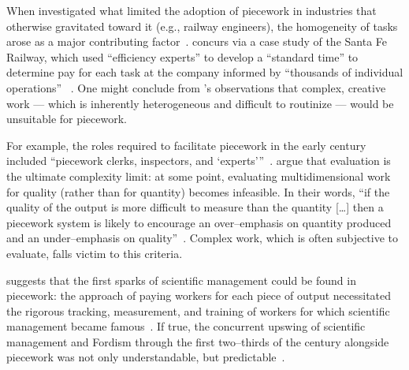 \documentclass[trackingWork]{subfiles}
\begin{document}
{
When \citeauthor{Brown01041990} investigated
what limited the adoption of piecework in industries that otherwise gravitated toward it
(e.g., railway engineers),
the homogeneity of tasks arose as a major contributing factor~\cite{Brown01041990}.
\citeauthor{10.2307/23702539} concurs via a case study of the Santa Fe Railway,
which used ``efficiency experts'' to develop a ``standard time''
to determine pay for each task at the company informed by
``thousands of individual operations''%
~\cite{10.2307/23702539}.
One might conclude from \citeauthor{10.2307/23702539}'s observations that
complex, creative work
--- which is inherently heterogeneous and difficult to routinize ---
would be unsuitable for piecework.

For example, the roles required to facilitate piecework in the early  century included ``piecework clerks, inspectors, and `experts'''~\cite{10.2307/23702539}.
\citeauthor{hart2016rise} argue that evaluation is the ultimate complexity limit:
at some point, evaluating multidimensional work for quality
(rather than for quantity) becomes infeasible.
In their words,
``if the quality of the output is more difficult to measure than the quantity [\ldots]
then a piecework system is likely to encourage
an over--emphasis on quantity produced and an under--emphasis on quality''~\cite{hart2016rise}.
Complex work, which is often subjective to evaluate, falls victim to this criteria.

\citeauthor{10.2307/23702539} suggests that the first sparks of scientific management
could be found in piecework:
the approach of paying workers for each piece of output necessitated
the rigorous tracking, measurement, and training of workers
for which scientific management became famous~\cite{10.2307/23702539}.
If true, 
the concurrent upswing of
scientific management and Fordism
through the first two--thirds of the  century
alongside piecework was not only understandable, but predictable~\cite{hart2013rise}.

}
\end{document}
